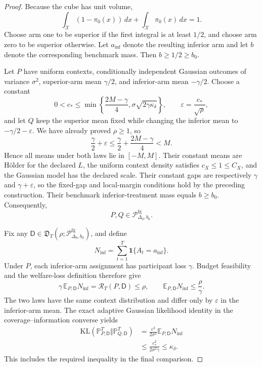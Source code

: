 \documentclass{article}
\begin{document}
\begin{proof}
Because the cube has unit volume,
\[
 \int_{\mathcal X}(1-\pi_0(x))\,dx+
 \int_{\mathcal X}\pi_0(x)\,dx=1.
\]
Choose arm one to be superior if the first integral is at least \(1/2\), and
choose arm zero to be superior otherwise.  Let \(a_{\mathrm{inf}}\) denote
the resulting inferior arm and let \(b\) denote the corresponding benchmark
mass.  Then \(b\geq1/2\geq b_0\).

Let \(P\) have uniform contexts, conditionally independent Gaussian outcomes
of variance \(\sigma^2\), superior-arm mean \(\gamma/2\), and inferior-arm
mean \(-\gamma/2\).  Choose a constant
\[
 0<c_*\leq\min\left\{\frac{2M-\gamma}{4},
 \sigma\sqrt{2\gamma\kappa_\delta}\right\},
 \qquad
 \varepsilon=\frac{c_*}{\sqrt\rho},
\]
and let \(Q\) keep the superior mean fixed while changing the inferior mean
to \(-\gamma/2-\varepsilon\).  We have already proved \(\rho\geq1\), so
\[
 \frac\gamma2+\varepsilon
 \leq\frac\gamma2+\frac{2M-\gamma}{4}<M.
\]
Hence all means under both laws lie in \([-M,M]\).  Their constant means are
H\"older for the declared \(L\), the uniform context density satisfies
\(c_X\leq1\leq C_X\), and the Gaussian model has the declared scale.  Their
constant gaps are respectively \(\gamma\) and \(\gamma+\varepsilon\), so the
fixed-gap and local-margin conditions hold by the preceding construction.
Their benchmark inferior-treatment mass equals \(b\geq b_0\).  Consequently,
\[
 P,Q\in\mathcal P_{\Delta_0,b_0}^{\mathrm{fg}}.
\]

Fix any
\(\mathsf D\in\mathfrak D_T(\rho;
\mathcal P_{\Delta_0,b_0}^{\mathrm{fg}})\), and define
\[
 N_{\mathrm{inf}}=\sum_{t=1}^T\mathbf1\{A_t=a_{\mathrm{inf}}\}.
\]
Under \(P\), each inferior-arm assignment has participant loss \(\gamma\).
Budget feasibility and the welfare-loss definition therefore give
\[
 \gamma\,\mathbb E_{P,\mathsf D}N_{\mathrm{inf}}
 =\mathcal R_T(P,\mathsf D)\leq\rho,
 \qquad
 \mathbb E_{P,\mathsf D}N_{\mathrm{inf}}\leq\frac\rho\gamma.
\]
The two laws have the same context distribution and differ only by
\(\varepsilon\) in the inferior-arm mean.  The exact adaptive Gaussian
likelihood identity in the coverage--information converse yields
\[
 \begin{aligned}
 \mathrm{KL}(\mathbb P_{P,\mathsf D}^{T}
             \Vert\mathbb P_{Q,\mathsf D}^{T})
 &=\frac{\varepsilon^2}{2\sigma^2}
   \mathbb E_{P,\mathsf D}N_{\mathrm{inf}}\\
 &\leq\frac{c_*^2}{2\sigma^2\gamma}
 \leq\kappa_\delta.
 \end{aligned}
\]
This includes the required inequality in the final comparison.


\end{proof}
\end{document}
